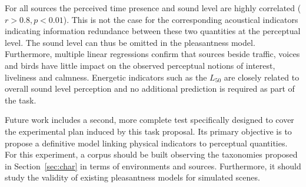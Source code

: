 \documentclass{article}
\begin{document}
\begin{sloppy}
For all sources the perceived time presence and sound level are highly correlated ($r>0.8, p<0.01$). This is not the case for the corresponding acoustical indicators indicating information redundance between these two quantities at the perceptual level. The sound level can thus be omitted in the pleasantness model. Furthermore, multiple linear regressions confirm that sources beside traffic, voices and birds have little impact on the observed perceptual notions of interest, liveliness and calmness. Energetic indicators such as the $L_{50}$ are closely related to overall sound level perception and no additional prediction is required as part of the task.

Future work includes a second, more complete test specifically designed to cover the experimental plan induced by this task proposal. Its primary objective is to propose a definitive model linking physical indicators to perceptual quantities. For this experiment, a corpus should be built observing the taxonomies proposed in Section~\ref{sec:char} in terms of environments and sources. Furthermore, it should study the validity of existing pleasantness models for simulated scenes.





%
%
%
%
%
%
%
%
%


\end{sloppy}
\end{document}
